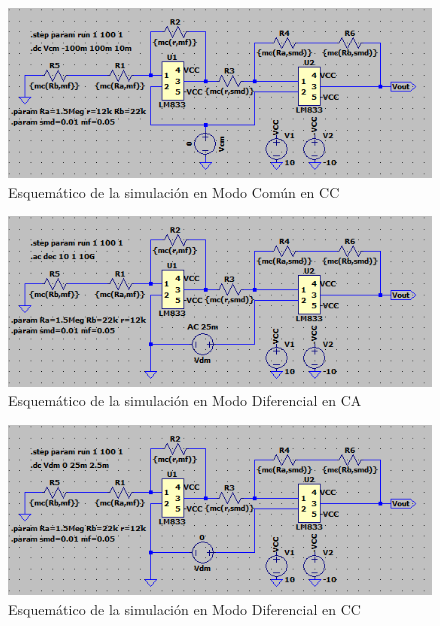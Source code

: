 \begin{figure}[ht]
\begin{center}
\includegraphics[scale=1]{res/spice/spice_cm_dc_sch.png}
\caption{Esquemático de la simulación en Modo Común en CC}
\label{e4:fig_spice_cm_dc}
\end{center}
\end{figure}

\begin{figure}[ht]
\begin{center}
\includegraphics[scale=1]{res/spice/spice_dm_ac_sch.png}
\caption{Esquemático de la simulación en Modo Diferencial en CA}
\label{e4:fig_spice_dm_ac}
\end{center}
\end{figure}

\begin{figure}[ht]
\begin{center}
\includegraphics[scale=1]{res/spice/spice_dm_dc_sch.png}
\caption{Esquemático de la simulación en Modo Diferencial en CC}
\label{e4:fig_spice_dm_dc}
\end{center}
\end{figure}

